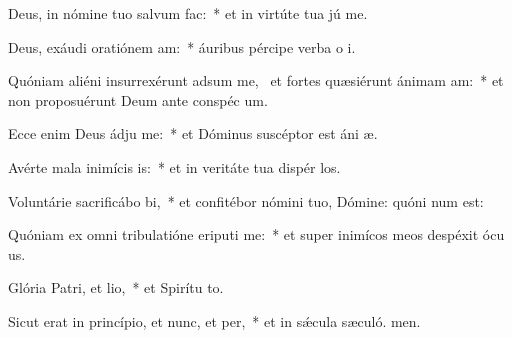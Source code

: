 \item Deus, in nómine tuo salvum  fac:~* et in virtúte tua jú me.
\item Deus, exáudi oratiónem am:~* áuribus pércipe verba o i.
\item Quóniam aliéni insurrexérunt adsum me,~\pscross{} et fortes quæsiérunt ánimam am:~* et non proposuérunt Deum ante conspéc um.
\item Ecce enim Deus ádju me:~* et Dóminus suscéptor est áni æ.
\item Avérte mala inimícis is:~* et in veritáte tua dispér los.
\item Voluntárie sacrificábo bi,~* et confitébor nómini tuo, Dómine: quóni num est:
\item Quóniam ex omni tribulatióne eriputi me:~* et super inimícos meos despéxit ócu us.
\item Glória Patri, et lio,~* et Spirítu to.
\item Sicut erat in princípio, et nunc, et per,~* et in sǽcula sæculó. men.
